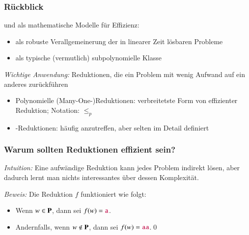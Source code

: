\documentclass[aspectratio=1610,onlymath]{beamer}
\begin{document}
\maketitle

\begin{frame}\frametitle{Rückblick}

 und  als mathematische Modelle für Effizienz:
\begin{itemize}
\item {} als robuste Verallgemeinerung der in linearer Zeit lösbaren Probleme
\item {} als typische (vermutlich) subpolynomielle Klasse
\end{itemize}\bigskip

\emph{Wichtige Anwendung:} Reduktionen, die ein Problem mit wenig Aufwand auf ein anderes zurückführen
\begin{itemize}
\item \alert{Polynomielle (Many-One-)Reduktionen:} verbreitetste Form von effizienter Reduktion; Notation: $\leq_p$
\item \alert{-Reduktionen:} häufig anzutreffen, aber selten im Detail definiert
\end{itemize}

\end{frame}

\begin{frame}\frametitle{Warum sollten Reduktionen effizient sein?}

\emph{Intuition:} Eine aufwändige Reduktion kann jedes Problem indirekt lösen, aber dadurch lernt man nichts
interessantes über dessen Komplexität.\pause
\bigskip

\pause

\emph{Beweis:} Die Reduktion $f$ funktioniert wie folgt:
\begin{itemize}
\item Wenn $w\in \textbf{\textcolor{black}{P}}$, dann sei $f(w)=\mathtt{\textcolor{purple}{a}}$.
\item Andernfalls, wenn $w\notin \textbf{\textcolor{black}{P}}$, dann sei $f(w)=\mathtt{\textcolor{purple}{aa}}$.\qed
\end{itemize}

\end{frame}
\end{document}
